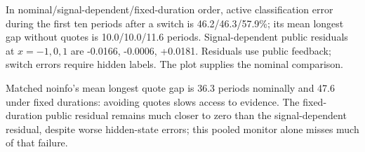 In nominal/signal-dependent/fixed-duration order, active classification error during the first ten periods after a switch is 46.2/46.3/57.9\%; its mean longest gap without quotes is 10.0/10.0/11.6 periods. Signal-dependent public residuals at $x=-1,0,1$ are -0.0166, -0.0006, +0.0181. Residuals use public feedback; switch errors require hidden labels. The plot supplies the nominal comparison.

Matched noinfo's mean longest quote gap is 36.3 periods nominally and 47.6 under fixed durations: avoiding quotes slows access to evidence. The fixed-duration public residual remains much closer to zero than the signal-dependent residual, despite worse hidden-state errors; this pooled monitor alone misses much of that failure.
